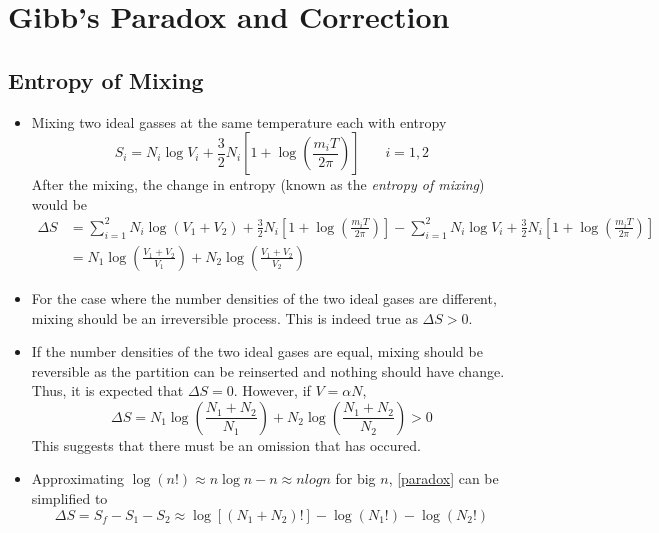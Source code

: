 \documentclass{article}
\begin{document}
\section{Gibb's Paradox and Correction}
\subsection{Entropy of Mixing}
\begin{itemize}
    \item Mixing two ideal gasses at the same temperature each with entropy
    \begin{equation}
        S_i=N_i\log V_i+\frac{3}{2}N_i\left[1+\log\left(\frac{m_iT}{2\pi}\right)\right]\:\:\:\:\:\:\:\:i=1,2
    \end{equation}
    After the mixing, the change in entropy (known as the \textit{entropy of mixing}) would be
    \begin{equation}
        \begin{aligned}
            \Delta S&=\sum_{i=1}^2N_i\log (V_1+V_2)+\frac{3}{2}N_i\left[1+\log\left(\frac{m_iT}{2\pi}\right)\right]-\sum_{i=1}^2N_i\log V_i+\frac{3}{2}N_i\left[1+\log\left(\frac{m_iT}{2\pi}\right)\right]\\
            &=N_1\log\left(\frac{V_1+V_2}{V_1}\right)+N_2\log\left(\frac{V_1+V_2}{V_2}\right)
        \end{aligned}
    \end{equation}
    \item For the case where the number densities of the two ideal gases are different, mixing should be an irreversible process. This is indeed true as $\Delta S>0$.
    \item If the number densities of the two ideal gases are equal, mixing should be reversible as the partition can be reinserted and nothing should have change. Thus, it is expected that $\Delta S=0$.
    However, if $V=\alpha N$,
    \begin{equation}
        \Delta S=N_1\log\left(\frac{N_1+N_2}{N_1}\right)+N_2\log\left(\frac{N_1+N_2}{N_2}\right)>0\label{paradox}
    \end{equation}
    This suggests that there must be an omission that has occured.
    \item Approximating $\log (n!)\approx n\log n-n\approx n log n$ for big $n$, \eqref{paradox} can be simplified to
    \begin{equation}
        \Delta S=S_f-S_1-S_2\approx\log [(N_1+N_2)!]-\log(N_1!)-\log(N_2!)
    \end{equation}

\end{itemize}
\end{document}
